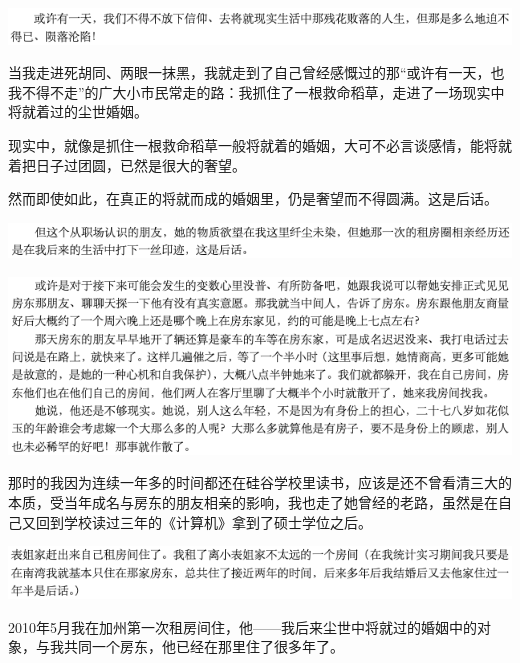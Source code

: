 \documentclass[9pt, b5paper]{article}
\begin{document}
\begin{center}
\includegraphics[width=.9\linewidth]{./pic/backups_plans_20210424_095046.png}
\end{center}

当我走进死胡同、两眼一抹黑，我就走到了自己曾经感慨过的那“或许有一天，也我不得不走”的广大小市民常走的路：我抓住了一根救命稻草，走进了一场现实中将就着过的尘世婚姻。

现实中，就像是抓住一根救命稻草一般将就着的婚姻，大可不必言谈感情，能将就着把日子过团圆，已然是很大的奢望。

然而即使如此，在真正的将就而成的婚姻里，仍是奢望而不得圆满。这是后话。

\begin{center}
\includegraphics[width=.9\linewidth]{./pic/backups_plans_20210423_204215.png}
\end{center}

\begin{center}
\includegraphics[width=.9\linewidth]{./pic/backups_plans_20210423_204134.png}
\end{center}

那时的我因为连续一年多的时间都还在硅谷学校里读书，应该是还不曾看清三大的本质，受当年成名与房东的朋友相亲的影响，我也走了她曾经的老路，虽然是在自己又回到学校读过三年的《计算机》拿到了硕士学位之后。

\begin{center}
\includegraphics[width=.9\linewidth]{./pic/backups_plans_20210423_202941.png}
\end{center}

2010年5月我在加州第一次租房间住，他——我后来尘世中将就过的婚姻中的对象，与我共同一个房东，他已经在那里住了很多年了。 
\end{document}
